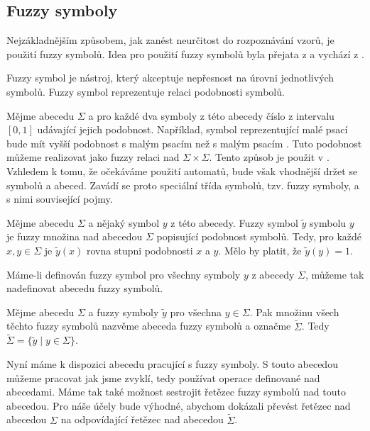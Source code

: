 \documentclass[a4paper,10pt]{article}
\begin{document}
\subsection{Fuzzy symboly}
Nejzákladnějším způsobem, jak zanést neurčitost do rozpoznávání vzorů, je použití fuzzy symbolů. Idea pro použití fuzzy symbolů byla přejata z \cite{AstGariGonVillFar-ApprStrMatUsiDefFuzzAutLearExpr} a vychází z \cite{RamGir-ConvFinAutFuzzAutStrComp}.

Fuzzy symbol je nástroj, který akceptuje nepřesnost na úrovni jednotlivých symbolů. Fuzzy symbol reprezentuje relaci podobnosti symbolů.

Mějme abecedu $\Sigma$ a pro každé dva symboly z této abecedy číslo z intervalu $[0, 1]$ udávající jejich podobnost. Například, symbol reprezentující malé psací  bude mít vyšší podobnost s malým psacím  než s malým psacím . Tuto podobnost můžeme realizovat jako fuzzy relaci nad $\Sigma \times \Sigma$. Tento způsob je použit v \cite{RamGir-ConvFinAutFuzzAutStrComp}. Vzhledem k tomu, že očekáváme použití automatů, bude však vhodnější držet se symbolů a abeced. Zavádí se proto speciální třída symbolů, tzv. fuzzy symboly, a s nimi související pojmy.

\begin{definition}
Mějme abecedu $\Sigma$ a nějaký symbol $y$ z této abecedy. Fuzzy symbol $\widetilde{y}$ symbolu $y$ je fuzzy množina nad abecedou $\Sigma$ popisující podobnost symbolů. Tedy, pro každé $x, y \in \Sigma$ je $\widetilde{y}(x)$ rovna stupni podobnosti $x$ a $y$. Mělo by platit, že $\widetilde{y}(y) = 1$.
\end{definition}

Máme-li definován fuzzy symbol pro všechny symboly $y$ z abecedy $\Sigma$, můžeme tak nadefinovat abecedu fuzzy symbolů.

\begin{definition}
Mějme abecedu $\Sigma$ a fuzzy symboly $\widetilde{y}$ pro všechna $y \in \Sigma$. Pak množinu všech těchto fuzzy symbolů nazvěme abeceda fuzzy symbolů a označme $\widetilde{\Sigma}$. Tedy $\widetilde{\Sigma} = \{ \widetilde{y} \mid y \in \Sigma \}$.
\end{definition}

Nyní máme k dispozici abecedu pracující s fuzzy symboly. S touto abecedou můžeme pracovat jak jsme zvyklí, tedy používat operace definované nad abecedami. Máme tak také možnost sestrojit řetězec fuzzy symbolů nad touto abecedou. Pro náše účely bude výhodné, abychom dokázali převést řetězec nad abecedou $\Sigma$ na odpovídající řetězec nad abecedou $\widetilde{\Sigma}$.
\end{document}
